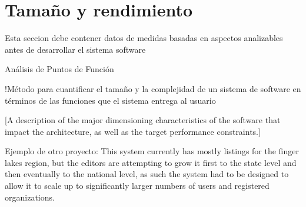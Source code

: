 \chapter{Tamaño y rendimiento}

Esta seccion debe contener datos de medidas basadas en aspectos analizables antes de desarrollar el sistema software

Análisis de Puntos de Función

    !Método para cuantificar el tamaño y la complejidad de un sistema de software en términos de las funciones que el sistema entrega al usuario 
    


[A description of the major dimensioning characteristics of the software that impact the architecture, as well as the target performance constraints.]

Ejemplo de otro proyecto:
    This system currently has mostly listings for the finger lakes region, but the editors are attempting to grow it first to the state level and then eventually to the national level, as such the system had to be designed to allow it to scale up to significantly larger numbers of users and registered organizations.
